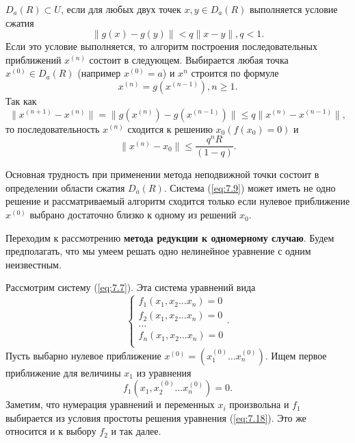 $D_a(R) \subset U$, если для любых двух точек $x, y \in D_a(R)$ выполняется условие сжатия
\begin{equation} \label{eq:7.13}
	\|g(x) - g(y)\| < q\|x - y\|, q < 1.
\end{equation}
Если это условие выполняется, то алгоритм построения последовательных приближений $x^{(n)}$ состоит в следующем. Выбирается любая точка $x^{(0)} \in D_a(R)$ (например $x^{(0)} = a$) и $x^{{n}}$ строится по формуле
\begin{equation} \label{eq:7.14}
	x^{(n)} = g(x^{(n-1)}), n \geq 1.
\end{equation}
Так как
\begin{equation} \label{eq:7.15}
	\|x^{(n+1)} - x^{(n)}\| = \|g(x^{(n)}) - g(x^{(n-1)})\| \leq q\|x^{(n)} - x^{(n-1)}\|,
\end{equation}
то последовательность $x^{(n)}$ сходится к решению $x_0 (f(x_0) = 0)$ и 
\begin{equation} \label{eq:7.16}
	\|x^{(n)} - x_0\| \leq \frac{q^nR}{(1-q)}.
\end{equation}


Основная трудность при применении метода неподвижной точки состоит в определении области сжатия $D_a(R)$. Система (\ref{eq:7.9}) может иметь не одно решение и рассматриваемый алгоритм сходится только если нулевое приближение $x^{(0)}$ выбрано достаточно близко к одному из решений $x_0$.

Переходим к рассмотрению \textbf{метода редукции к одномерному случаю}. Будем предполагать, что мы умеем решать одно нелинейное уравнение с одним неизвестным.

Рассмотрим систему (\ref{eq:7.7}). Эта система уравнений вида
\begin{equation} \label{eq:7.17}
	\begin{cases} 
		f_1(x_1, x_2 \dots x_n) = 0 \\
		f_2(x_1, x_2 \dots x_n) = 0 \\
		\dots \\
		f_n(x_1, x_2 \dots x_n) = 0 \\
	\end{cases}.
\end{equation}
Пусть выбарно нулевое приближение $x^{(0)} = (x_1^{(0)} \dots x_n^{(0)})$. Ищем первое приближение для величины $x_1$ из уравнения
\begin{equation} \label{eq:7.18}
	f_1(x_1, x_2^{(0)} \dots x_n^{(0)}) = 0.
\end{equation}
Заметим, что нумерация уравнений и переменных $x_i$ произвольна и $f_1$ выбирается из условия простоты решения уравнения (\ref{eq:7.18}). Это же относится и к выбору $f_2$ и так далее.

